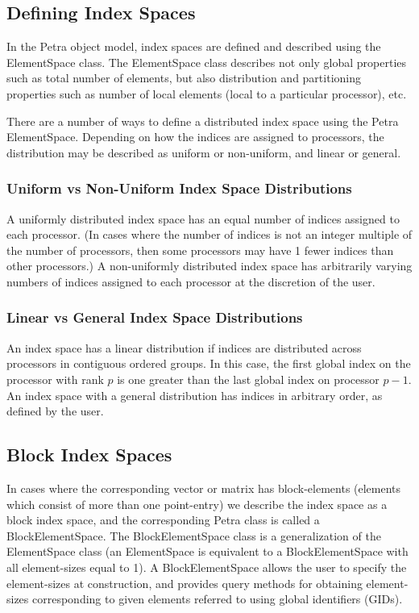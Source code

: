 \documentclass[10pt,relax]{PetraObjectModel}
\begin{document}
\subsection{Defining Index Spaces}
In the Petra object model, index spaces are defined and described using the
ElementSpace class. The ElementSpace class describes not only global properties
such as total
number of elements, but also distribution and partitioning properties such as
number of local elements (local to a particular processor), etc.

There are a number of ways to define a distributed index space using the Petra
ElementSpace. Depending on how the indices are assigned to processors, the
distribution
may be described as uniform or non-uniform, and linear or general.

\subsubsection{Uniform vs Non-Uniform Index Space Distributions}
A uniformly distributed index space has an equal number of indices assigned
to each processor. (In cases where the number of indices is not an integer
multiple of the number of processors, then some processors may have 1 fewer
indices than other processors.) A non-uniformly distributed index space has
arbitrarily varying numbers of indices assigned to each processor at
the discretion of the user.

\subsubsection{Linear vs General Index Space Distributions}
An index space has a linear distribution if indices are distributed across
processors in contiguous ordered groups. In this case, the first global index
on the processor with rank $p$ is one greater than the last global index on
processor $p-1$. An index space with
a general distribution has indices in arbitrary order, as defined by the user.

\subsection{Block Index Spaces}
In cases where the corresponding vector or matrix has block-elements (elements
which consist of more than one point-entry) we describe the index space as a
block index space, and the corresponding Petra class is called a
BlockElementSpace. The BlockElementSpace class is a generalization of the
ElementSpace class (an ElementSpace is equivalent to a
BlockElementSpace with all element-sizes equal to 1). A BlockElementSpace
 allows the user to
specify the element-sizes at construction, and provides query methods for
obtaining element-sizes corresponding to given elements referred to using
global identifiers (GIDs).
\end{document}
